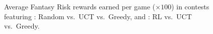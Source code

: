 \documentclass[letterpaper]{article}
\numberwithin{equation}{section}
\numberwithin{theorem}{section}
\numberwithin{lemma}{section}
\numberwithin{df}{section}
\begin{document}
\begin{figure}[t]
\centering
{}\hspace{5pt}
\caption[]{Average Fantasy Risk rewards earned per game ($\times 100$) in contests featuring : Random vs.~UCT vs.~Greedy, and : RL vs.~UCT vs.~Greedy.}
\label{fig:FantRisk1}
\end{figure}  
\end{document}
